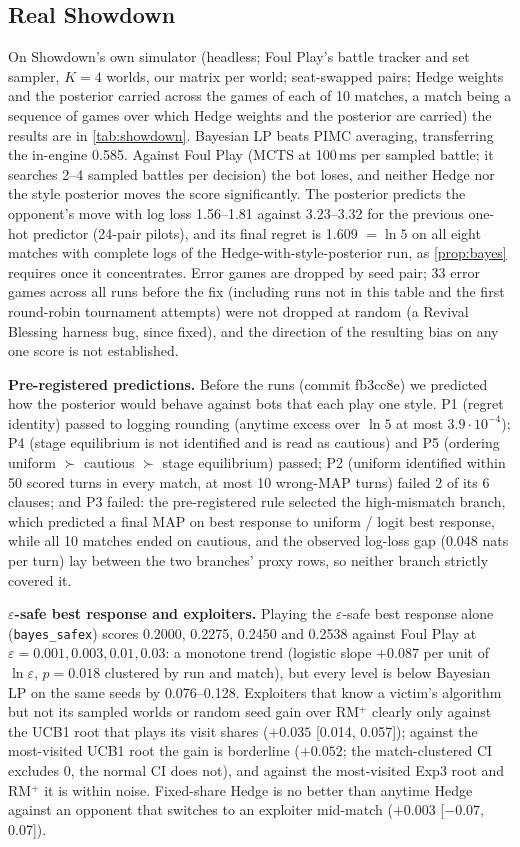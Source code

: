\documentclass[10pt]{article}
\theoremstyle{plain}
\theoremstyle{definition}
\theoremstyle{remark}
\begin{document}
\subsection{Real Showdown}
\label{sec:showdown}
On Showdown's own simulator (headless; Foul Play's battle tracker and set sampler, $K=4$ worlds, our matrix per world; seat-swapped pairs; Hedge weights and the posterior carried across the games of each of 10 matches, a match being a sequence of games over which Hedge weights and the posterior are carried) the results are in \cref{tab:showdown}. Bayesian LP beats PIMC averaging, transferring the in-engine 0.585. Against Foul Play (MCTS at 100\,ms per sampled battle; it searches 2--4 sampled battles per decision) the bot loses, and neither Hedge nor the style posterior moves the score significantly. The posterior predicts the opponent's move with log loss 1.56--1.81 against 3.23--3.32 for the previous one-hot predictor (24-pair pilots), and its final regret is 1.609 $=\ln5$ on all eight matches with complete logs of the Hedge-with-style-posterior run, as \cref{prop:bayes} requires once it concentrates. Error games are dropped by seed pair; 33 error games across all runs before the fix (including runs not in this table and the first round-robin tournament attempts) were not dropped at random (a Revival Blessing harness bug, since fixed), and the direction of the resulting bias on any one score is not established.

\textbf{Pre-registered predictions.} Before the runs (commit fb3cc8e) we predicted how the posterior would behave against bots that each play one style. P1 (regret identity) passed to logging rounding (anytime excess over $\ln5$ at most $3.9\cdot10^{-4}$); P4 (stage equilibrium is not identified and is read as cautious) and P5 (ordering uniform $\succ$ cautious $\succ$ stage equilibrium) passed; P2 (uniform identified within 50 scored turns in every match, at most 10 wrong-MAP turns) failed 2 of its 6 clauses; and P3 failed: the pre-registered rule selected the high-mismatch branch, which predicted a final MAP on best response to uniform / logit best response, while all 10 matches ended on cautious, and the observed log-loss gap (0.048 nats per turn) lay between the two branches' proxy rows, so neither branch strictly covered it.

\textbf{$\varepsilon$-safe best response and exploiters.} Playing the $\varepsilon$-safe best response alone (\texttt{bayes\_safex}) scores 0.2000, 0.2275, 0.2450 and 0.2538 against Foul Play at $\varepsilon=0.001,0.003,0.01,0.03$: a monotone trend (logistic slope $+0.087$ per unit of $\ln\varepsilon$, $p=0.018$ clustered by run and match), but every level is below Bayesian LP on the same seeds by 0.076--0.128. Exploiters that know a victim's algorithm but not its sampled worlds or random seed gain over RM$^+$ clearly only against the UCB1 root that plays its visit shares ($+0.035$ [0.014, 0.057]); against the most-visited UCB1 root the gain is borderline ($+0.052$; the match-clustered CI excludes 0, the normal CI does not), and against the most-visited Exp3 root and RM$^+$ it is within noise. Fixed-share Hedge is no better than anytime Hedge against an opponent that switches to an exploiter mid-match ($+0.003$ [$-0.07$, 0.07]).
\end{document}
